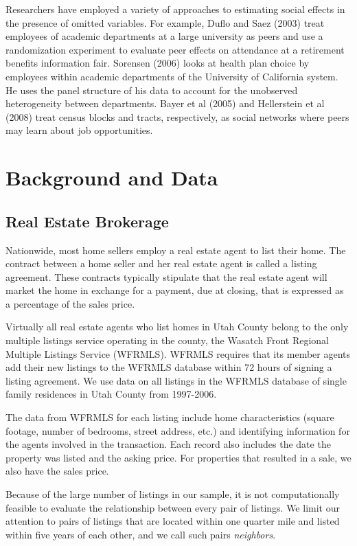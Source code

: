 \documentclass[AEJ,draftmode]{AEA}
\begin{document}
    Researchers have employed a variety of approaches to estimating social effects in the presence of omitted variables. For example, Duflo and Saez (2003) treat employees of academic departments at a large university as peers and use a randomization experiment to evaluate peer effects on attendance at a retirement benefits information fair. Sorensen (2006) looks at health plan choice by employees within academic departments of the University of California system. He uses the panel structure of his data to account for the unobserved heterogeneity between departments.  Bayer et al (2005) and Hellerstein et al (2008) treat census blocks and tracts, respectively, as social networks where peers may learn  about job opportunities.

\section{Background and Data}

\subsection{Real Estate Brokerage}
    Nationwide, most home sellers employ a real estate agent to list their home. The contract between a home seller and her real estate agent is  called a listing agreement. These contracts typically stipulate that the real estate agent will market the home in exchange for a payment, due at  closing, that is expressed as a percentage of the sales price.

    Virtually all real estate agents who list homes in Utah County belong to the only multiple listings service operating in the county, the Wasatch  Front Regional Multiple Listings Service (WFRMLS).  WFRMLS requires that its member agents add their new listings to the WFRMLS database within 72 hours of signing a listing agreement. We use data on all listings in the WFRMLS database of single family residences in Utah County from 1997-2006.

    The data from WFRMLS for each listing include home characteristics (square footage, number of bedrooms, street address, etc.) and identifying information for the agents involved in the transaction. Each record also includes the date the property was listed and the asking price. For properties that resulted in a sale, we also have the sales price.

    Because of the large number of listings in our sample, it is not computationally feasible to evaluate the relationship between every pair of listings. We limit our attention to pairs of listings that are located within one quarter mile and listed within five years of each other, and we call such pairs \emph{neighbors}.
\end{document}
